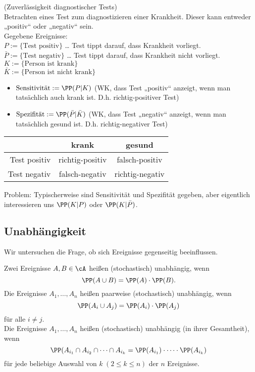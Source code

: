  (Zuverlässigkeit diagnostischer Tests)\\
Betrachten eines Test zum diagnostizieren einer Krankheit. Dieser kann entweder „positiv“ oder „negativ“ sein.\\
Gegebene Ereignisse:\\
$P:=\{\text{Test positiv}\}$ … Test tippt darauf, dass Krankheit vorliegt.\\
$\bar P:=\{\text{Test negativ}\}$ … Test tippt darauf, dass Krankheit nicht vorliegt.\\
$K:= \{\text{Person ist krank}\}$\\
$\bar K:= \{\text{Person ist nicht krank}\}$
\begin{itemize}
\item $\text{Sensitivität}:=\PP(P|K)$ (WK, dass Test „positiv“ anzeigt, wenn man tatsächlich auch krank ist. D.h. richtig-positiver Test)
\item $\text{Spezifität}:=\PP(\bar P|\bar K)$ (WK, dass Test „negativ“ anzeigt, wenn man tatsächlich gesund ist. D.h. richtig-negativer Test)
\end{itemize}
\begin{tabular}{r | c c}
& krank & gesund\\
\hline
Test positiv & richtig-positiv & falsch-positiv\\
Test negativ & falsch-negativ & richtig-negativ
\end{tabular}

Problem: Typischerweise sind Sensitivität und Spezifität gegeben, aber eigentlich interessieren uns $\PP(K|P)$ oder $\PP(K|\bar P)$.

\subsection{Unabhängigkeit}
Wir untersuchen die Frage, ob sich Ereignisse gegenseitig beeinflussen.

 Zwei Ereignisse $A,B \in \cA$ heißen (stochastisch) unabhängig, wenn 
$$\PP(A\cup B)=\PP(A) \cdot \PP(B)\text{.}$$
Die Ereignisse $A_1,\dots, A_n$ heißen paarweise (stochastisch) unabhängig, wenn 
$$\PP(A_i\cup A_j) = \PP(A_i)\cdot \PP(A_j)$$
für alle $i\not=j$.\\
Die Ereignisse $A_1,\dots,A_n$ heißen (stochastisch) unabhängig (in ihrer Gesamtheit), wenn 
$$\PP(A_{i_1}\cap A_{i_2}\cap \dots \cap A_{i_k}=\PP(A_{i_1})\cdot \dots \cdot \PP(A_{i_k})$$
für jede beliebige Auswahl von $k \;(2\leq k \leq n)$ der $n$ Ereignisse.

